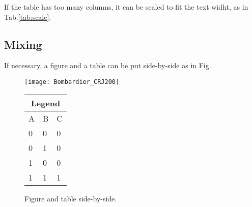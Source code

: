 If the table has too many columns, it can be scaled to fit the text widht, as in Tab.\ref{tab:scale}.
\begin{table}[!htb]
  \renewcommand{\arraystretch}{1.2} %
  \centering
  \caption{Very wide table.}
  \label{tab:scale}%
\end{table}
\fi

\subsection{Mixing}
\label{section:mixing}

If necessary, a figure and a table can be put side-by-side as in Fig.
\iffalse
\begin{figure}[!htb]
  \begin{minipage}[b]{0.60\linewidth}
    \centering
    \texttt{[image: Bombardier\_CRJ200]}
  \end{minipage}%
  \begin{minipage}[b]{0.30\linewidth}
    \centering
    \begin{tabular}[b]{lll}
      \toprule
        \multicolumn{3}{c}{Legend} \\
      \midrule
        A & B & C \\
        0 & 0 & 0 \\
        0 & 1 & 0 \\
        1 & 0 & 0 \\
        1 & 1 & 1 \\
      \bottomrule
    \end{tabular}
    \vspace{5em}
  \end{minipage}
\caption{Figure and table side-by-side.}
\label{fig:side_by_side}
\end{figure}

